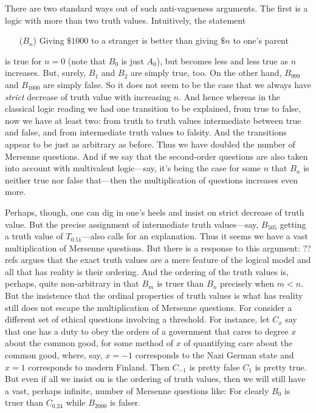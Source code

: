 There are two standard ways out of such anti-vagueness arguments. The first is a logic with more than two truth values. Intuitively, the statement 
\begin{itemize}
\item[($B_n$)] Giving $ \$1000$ to a stranger is better than giving $ \$n$ to one's parent 
\end{itemize}
is true for $n=0$ (note that $B_0$ is just $A_0$), but becomes less and less true as $n$ increases. 
But, surely, $B_1$ and $B_2$ are simply true, too. On the other hand, $B_{999}$ and $B_{1000}$ are simply false. So it does not seem to be the case
that we always have \textit{strict} decrease of truth value with increasing $n$. And hence whereas in the
classical logic reading we had one transition to be explained, from true to false, now we have at least two: from truth to truth values intermediate
between true and false, and from intermediate truth values to falsity. And the transitions appear to be just as arbitrary as before. Thus we have doubled 
the number of Mersenne questions. And if we say that the second-order questions are also taken into account with multivalent logic---say, it's being
the case for some $n$ that $B_n$ is neither true nor false that---then the multiplication of questions increases even more.

Perhaps, though, one can dig in one's heels and insist on strict decrease of truth value. But the precise assignment of 
intermediate truth values---say, $B_{505}$ getting a truth value of $T_{0.51}$---also calls for an explanation. Thus it seems we have a vast multiplication
of Mersenne questions. But there is a response to this argument: ??refs argues that 
the exact truth values are a mere feature of the logical model and all that has reality is their ordering. And
the ordering of the truth values is, perhaps, quite non-arbitrary in that $B_{m}$ is truer than $B_n$ precisely when $m<n$. But the insistence that the ordinal
properties of truth values is what has reality still does not escape the multiplication of Mersenne questions. For consider a different set of ethical
questions involving a threshold. For instance, let $C_x$ say that one has a duty to obey the orders of a government that cares to degree $x$ about the common
good, for some method of $x$ of quantifying care about the common good, where, say, $x=-1$ corresponds to the Nazi German state and $x=1$ corresponds to modern
Finland. Then $C_{-1}$ is pretty false $C_1$ is pretty true. But even if all we insist on is the ordering of truth values, then we will still have a vast,
perhaps infinite, number of Mersenne  questions like: 
For clearly $B_0$ is truer than $C_{0.24}$ while $B_{2000}$ is falser.

